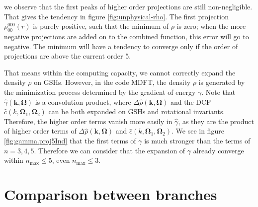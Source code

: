 we observe that the first peaks of higher order projections are still
non-negligible. That gives the tendency in figure \ref{fig:unphysical-rho}.
The first projection $\rho_{00}^{000}(r)$ is purely positive, such
that the minimum of $\rho$ is zero; when the more negative projections
are added on to the combined function, this error will go to negative.
The minimum will have a tendency to converge only if the order of
projections are above the current order 5.

That means within the computing capacity, we cannot correctly expand
the density $\rho$ on \acs{GSH}s. However, in the code MDFT, the
density $\rho$ is generated by the minimization process determined
by the gradient of energy $\gamma$. Note that $\hat{\gamma}(\mathbf{k},\mathbf{\Omega})$
is a convolution product, where $\Delta\hat{\rho}(\mathbf{k},\mathbf{\Omega})$
and the \acs{DCF} $\hat{c}(k,\mathbf{\Omega}_{1},\mathbf{\Omega}_{2})$
can be both expanded on \acs{GSH}s and rotational invariants. Therefore,
the higher order terms vanish more easily in $\hat{\gamma}$, as they
are the product of higher order terms of $\Delta\hat{\rho}(\mathbf{k},\mathbf{\Omega})$
and $\hat{c}(k,\mathbf{\Omega}_{1},\mathbf{\Omega}_{2})$. We see
in figure \ref{fig:gamma.proj5Ind} that the first terms of $\gamma$
is much stronger than the terms of $n=3,4,5$. Therefore we can consider
that the expansion of $\gamma$ already converge within $n_{\max}\leq5$,
even $n_{\max}\leq3$.

\section{Comparison between branches}

